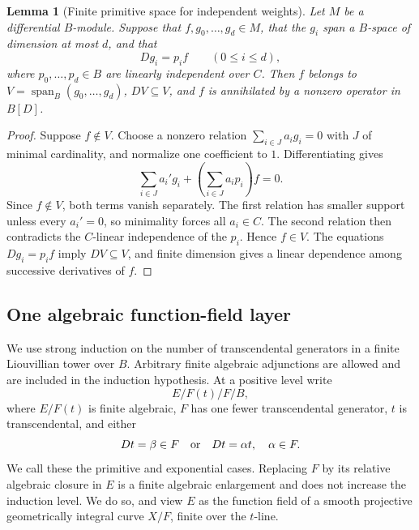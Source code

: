 \documentclass[11pt,a4paper]{article}
\newtheorem{lemma}[theorem]{Lemma}
\theoremstyle{definition}
\theoremstyle{remark}
\numberwithin{equation}{section}
\begin{document}
\begin{lemma}[Finite primitive space for independent weights]
\label{stab:finite-space}
Let $M$ be a differential $B$-module.  Suppose that
$f,g_0,\ldots,g_d\in M$, that the $g_i$ span a $B$-space of
dimension at most $d$, and that
\[
 Dg_i=p_i f\qquad(0\leq i\leq d),
\]
where $p_0,\ldots,p_d\in B$ are linearly independent over $C$.
Then $f$ belongs to $V=\operatorname{span}_B(g_0,\ldots,g_d)$,
$DV\subseteq V$, and $f$ is annihilated by a nonzero operator in
$B[D]$.
\end{lemma}
\begin{proof}
Suppose $f\notin V$.  Choose a nonzero relation
$\sum_{i\in J}a_i g_i=0$ with $J$ of minimal cardinality, and
normalize one coefficient to $1$.  Differentiating gives
\[
 \sum_{i\in J}a_i'g_i+
 \left(\sum_{i\in J}a_i p_i\right)f=0.
\]
Since $f\notin V$, both terms vanish separately.  The first relation
has smaller support unless every $a_i'=0$, so minimality forces all
$a_i\in C$.  The second relation then contradicts the $C$-linear
independence of the $p_i$.  Hence $f\in V$.  The equations
$Dg_i=p_if$ imply $DV\subseteq V$, and finite dimension gives a
linear dependence among successive derivatives of $f$.
\end{proof}


\subsection{One algebraic function-field layer}

We use strong induction on the number of transcendental generators in a
finite Liouvillian tower over $B$.  Arbitrary finite algebraic
adjunctions are allowed and are included in the induction hypothesis.
At a positive level write
\begin{equation}\label{stab:layer}
 E/F(t)/F/B,
\end{equation}
where $E/F(t)$ is finite algebraic, $F$ has one fewer transcendental
generator, $t$ is transcendental, and either
\[
 Dt=\beta\in F\quad\hbox{or}\quad Dt=\alpha t,\quad\alpha\in F.
\]
We call these the primitive and exponential cases.  Replacing $F$ by
its relative algebraic closure in $E$ is a finite algebraic enlargement
and does not increase the induction level.  We do so, and view $E$ as
the function field of a smooth projective geometrically integral curve
$X/F$, finite over the $t$-line.
\end{document}
